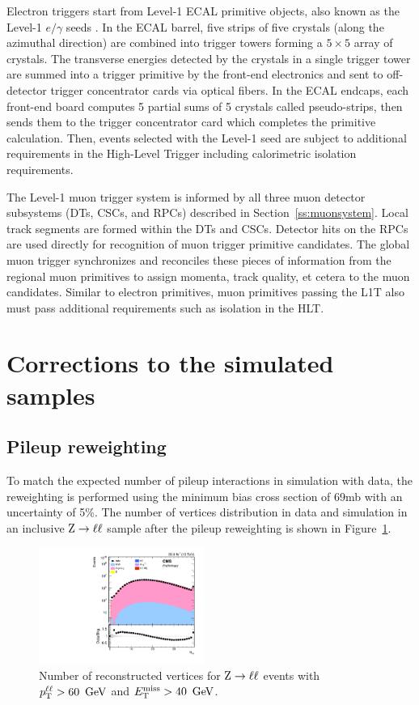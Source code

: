 Electron triggers start from Level-1 ECAL primitive objects,
also known as the Level-1 $e/\gamma$ seeds \cite{Khachatryan:2016bia}.
In the ECAL barrel, five strips of five crystals (along the azimuthal direction)
are combined into trigger towers forming a $5\times5$ array of crystals.
The transverse energies detected by the crystals in a single trigger tower are summed
into a trigger primitive by the front-end electronics and sent to off-detector
trigger concentrator cards via optical fibers. 
In the ECAL endcaps, each front-end board computes 5 partial sums of 5 crystals called pseudo-strips,
then sends them to the trigger concentrator card which completes the primitive calculation.
Then, events selected with the Level-1 seed are subject to additional requirements in
the High-Level Trigger including calorimetric isolation requirements.

The Level-1 muon trigger system is informed by all three muon detector subsystems (DTs, CSCs, and RPCs) described in Section~\ref{ss:muonsystem}.
Local track segments are formed within the DTs and CSCs.
Detector hits on the RPCs are used directly for recognition of muon trigger primitive candidates.
The global muon trigger synchronizes and reconciles these pieces of information
from the regional muon primitives to assign momenta, track quality, et cetera to the muon candidates.
Similar to electron primitives, muon primitives passing the L1T also must pass
additional requirements such as isolation in the HLT.

\section{Corrections to the simulated samples}
\subsection{Pileup reweighting}
\label{subsec:puweights}

To match the expected number of pileup interactions in simulation with data,
the reweighting is performed using the minimum bias cross section of 69mb with an uncertainty of 5\%. 
The number of vertices distribution in data and simulation in an inclusive $\mathrm{Z} \to \ell\ell$ sample after the pileup reweighting 
is shown in Figure~\ref{fig:pileup_distribution}.

\begin{figure}[htbp]
  \centering
  \includegraphics[width=0.48\textwidth]{figures/zll_nvtx_met40_zpt60.pdf}
  \caption{
    Number of reconstructed vertices
    for $\mathrm{Z} \to \ell\ell$ events with $p_{\mathrm{T}}^{\ell\ell} > 60~\,\text{Ge\hspace{-.08em}V}$ and $E_\mathrm{T}^{\mathrm{miss}} > 40~\,\text{Ge\hspace{-.08em}V}$.
  }
  \label{fig:pileup_distribution}
\end{figure}

